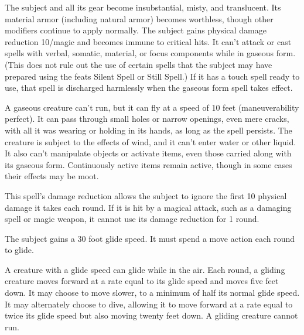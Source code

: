 \begin{comment}
\subsubsection{G}
\end{comment}

\spellrng{\rngtouch}
\begin{spelleffect}
  The subject and all its gear become insubstantial, misty, and translucent. Its material armor (including natural armor) becomes worthless, though other modifiers continue to apply normally. The subject gains physical damage reduction 10/magic and becomes immune to critical hits. It can't attack or cast spells with verbal, somatic, material, or focus components while in gaseous form. (This does not rule out the use of certain spells that the subject may have prepared using the feats Silent Spell or Still Spell.) If it has a touch spell ready to use, that spell is discharged harmlessly when the gaseous form spell takes effect.
  \par A gaseous creature can't run, but it can fly at a speed of 10 feet (maneuverability perfect). It can pass through small holes or narrow openings, even mere cracks, with all it was wearing or holding in its hands, as long as the spell persists. The creature is subject to the effects of wind, and it can't enter water or other liquid. It also can't manipulate objects or activate items, even those carried along with its gaseous form. Continuously active items remain active, though in some cases their effects may be moot.
\end{spelleffect}
\begin{spellnotes}
  This spell's damage reduction allows the subject to ignore the first 10 physical damage it takes each round. If it is hit by a magical attack, such as a damaging spell or magic weapon, it cannot use its damage reduction for 1 round.
\end{spellnotes}

\spellrng{\rngmed}
\spelldur{\durlong}
\begin{spelleffect}
  The subject gains a 30 foot glide speed. It must spend a move action each round to glide.
\end{spelleffect}
\begin{spellnotes}
  A creature with a glide speed can glide while in the air. Each round, a gliding creature moves forward at a rate equal to its glide speed and moves five feet down. It may choose to move slower, to a minimum of half its normal glide speed. It may alternately choose to dive, allowing it to move forward at a rate equal to twice its glide speed but also moving twenty feet down. A gliding creature cannot run.
\end{spellnotes}

